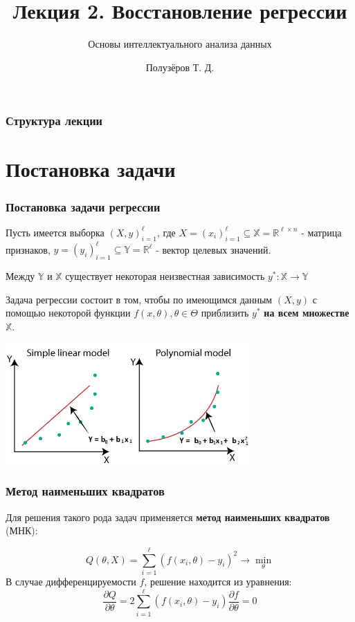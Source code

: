\documentclass{beamer}
\title[Восстановление регрессии]{Лекция 2. Восстановление регрессии}
\subtitle{Основы интеллектуального анализа данных}
\author{Полузёров Т. Д.}
\institute{БГУ ФПМИ}
\date{}
\begin{document}
	
	\begin{frame}
		\titlepage
	\end{frame}
	
	
	\begin{center}
		\frametitle{Структура лекции}
		\tableofcontents	
	\end{center}
	
	
	\section{Постановка задачи}
	
	
	\begin{frame}
		\frametitle{Постановка задачи регрессии}
		Пусть имеется выборка $(X, y)_{i=1}^{\ell}$, где $X = (x_i)_{i=1}^{\ell} \subseteq \mathbb{X} = \mathbb{R}^{\ell \times n}$ - матрица признаков, $y = (y_i)_{i=1}^{\ell}\subseteq \mathbb{Y} = \mathbb{R}^{\ell}$ - вектор целевых значений.
		
		Между $\mathbb{Y}$ и $\mathbb{X}$ существует некоторая неизвестная зависимость $y^{*}: \mathbb{X} \to \mathbb{Y}$
		
		\vspace{5pt}
		
		Задача регрессии состоит в том, чтобы по имеющимся данным $(X, y)$ с помощью некоторой функции $f(x, \theta), \theta \in \Theta$ приблизить $y^{*}$ \textbf{на всем множестве} $\mathbb{X}$.
		
		\centering
		\includegraphics[width=0.7\textwidth]{img/regr_ex.png}
	\end{frame}
	
	
	\begin{frame}
		\frametitle{Метод наименьших квадратов}
		Для решения такого рода задач применяется \textbf{метод наименьших квадратов} (МНК):
		
		$$
		Q(\theta, X) = \sum_{i=1}^{\ell} (f(x_i, \theta) - y_i)^{2} \to \min_{\theta}
		$$
		В случае дифференцируемости $f$, решение находится из уравнения:
		$$
		\frac{\partial Q}{\partial \theta} = 2 \sum_{i=1}^{\ell} (f(x_i, \theta) - y_i) \frac{\partial f}{\partial \theta} = 0
		$$
		
	\end{frame}
\end{document}
